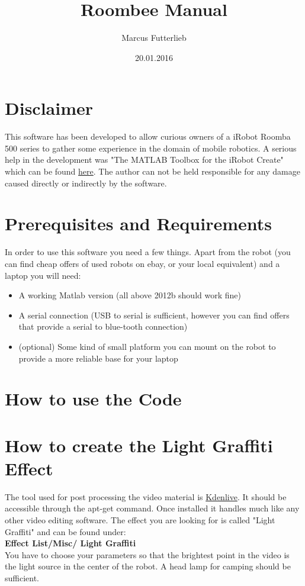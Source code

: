 \documentclass[a4paper,10pt]{book}
\title{Roombee Manual}
\author{Marcus Futterlieb}
\date{20.01.2016}
\begin{document}
\dominitoc
\maketitle

\tableofcontents

\chapter{Disclaimer}
This software has been developed to allow curious owners of a iRobot Roomba 500 series to gather some experience in the domain of mobile robotics. 
A serious help in the development was "The MATLAB Toolbox for the iRobot Create" which can be found \href{http://www.usna.edu/Users/weapsys/esposito/roomba-matlab.php}{here}.
The author can not be held responsible for any damage caused directly or indirectly by the software. 


\chapter{Prerequisites and Requirements}
In order to use this software you need a few things.
Apart from the robot (you can find cheap offers of used robots on ebay, or your local equivalent) and a laptop you will need:
\begin{itemize}
  \item A working Matlab version (all above 2012b should work fine)
  \item A serial connection (USB to serial is sufficient, however you can find offers that provide a serial to blue-tooth connection)
  \item (optional) Some kind of small platform you can mount on the robot to provide a more reliable base for your laptop
\end{itemize}


\chapter{How to use the Code}
\chapter{How to create the Light Graffiti Effect}
The tool used for post processing the video material is \href{https://kdenlive.org/}{Kdenlive}.
It should be accessible through the apt-get command.
Once installed it handles much like any other video editing software.
The effect you are looking for is called "Light Graffiti" and can be found under:\\
\textbf{Effect List/Misc/ Light Graffiti} \\
You have to choose your parameters so that the brightest point in the video is the light source in the center of the robot.
A head lamp for camping should be sufficient. 
\end{document}
